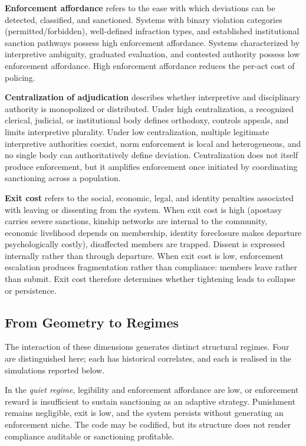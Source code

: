 \documentclass[12pt]{article}
\begin{document}
\textbf{Enforcement affordance} refers to the ease with which deviations can be detected, classified, and sanctioned. Systems with binary violation categories (permitted/forbidden), well-defined infraction types, and established institutional sanction pathways possess high enforcement affordance. Systems characterized by interpretive ambiguity, graduated evaluation, and contested authority possess low enforcement affordance. High enforcement affordance reduces the per-act cost of policing.

\textbf{Centralization of adjudication} describes whether interpretive and disciplinary authority is monopolized or distributed. Under high centralization, a recognized clerical, judicial, or institutional body defines orthodoxy, controls appeals, and limits interpretive plurality. Under low centralization, multiple legitimate interpretive authorities coexist, norm enforcement is local and heterogeneous, and no single body can authoritatively define deviation. Centralization does not itself produce enforcement, but it amplifies enforcement once initiated by coordinating sanctioning across a population.

\textbf{Exit cost} refers to the social, economic, legal, and identity penalties associated with leaving or dissenting from the system. When exit cost is high (apostasy carries severe sanctions, kinship networks are internal to the community, economic livelihood depends on membership, identity foreclosure makes departure psychologically costly), disaffected members are trapped. Dissent is expressed internally rather than through departure. When exit cost is low, enforcement escalation produces fragmentation rather than compliance: members leave rather than submit. Exit cost therefore determines whether tightening leads to collapse or persistence.

\subsection{From Geometry to Regimes}

The interaction of these dimensions generates distinct structural regimes. Four are distinguished here; each has historical correlates, and each is realised in the simulations reported below.

In the \textit{quiet regime}, legibility and enforcement affordance are low, or enforcement reward is insufficient to sustain sanctioning as an adaptive strategy. Punishment remains negligible, exit is low, and the system persists without generating an enforcement niche. The code may be codified, but its structure does not render compliance auditable or sanctioning profitable.
\end{document}
